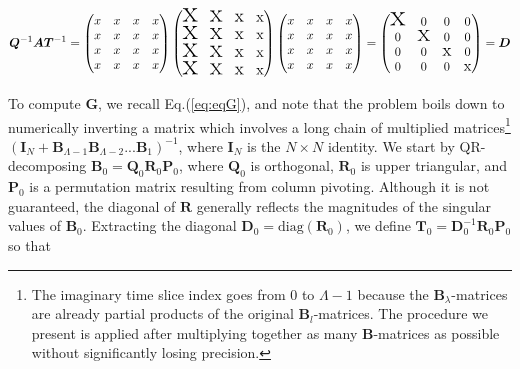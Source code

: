 \begin{equation}
\bm Q^{-1} \bm A \bm T^{-1} =
\begin{pmatrix}
x & x & x & x \\
x & x & x & x \\
x & x & x & x \\ 
x & x & x & x 
\end{pmatrix}
\begin{pmatrix}
$$ \mbox{\Huge x} $$ & $$ \mbox{\huge x} $$ & $$ \mbox{\Large x} $$ & $$ \mbox{\large x} $$\\
$$ \mbox{\Huge x} $$ & $$ \mbox{\huge x} $$ & $$ \mbox{\Large x} $$ & $$ \mbox{\large x} $$ \\
$$ \mbox{\Huge x} $$ & $$ \mbox{\huge x} $$ & $$ \mbox{\Large x} $$ & $$ \mbox{\large x} $$ \\ 
$$ \mbox{\Huge x} $$ & $$ \mbox{\huge x} $$ & $$ \mbox{\Large x} $$ & $$ \mbox{\large x} $$
\end{pmatrix}
\begin{pmatrix}
x & x & x & x \\
x & x & x & x \\
x & x & x & x \\ 
x & x & x & x 
\end{pmatrix} = 
\begin{pmatrix}
$$ \mbox{\Huge x} $$ & 0 & 0 & 0 \\
0 & $$ \mbox{\huge x} $$ & 0 & 0 \\
0 & 0 & $$ \mbox{\Large x} $$ & 0 \\ 
0 & 0 & 0 & $$ \mbox{\large x} $$
\end{pmatrix} = \bm D
\end{equation}

To compute $\bm G$, we recall Eq.(\ref{eq:eqG}), and note that the problem boils down to numerically inverting a matrix which involves a long chain of multiplied matrices\footnote{The imaginary time slice index goes from 0 to $\Lambda - 1$ because the $\bm B_\lambda$-matrices are already partial products of the original $\bm B_l$-matrices.
The procedure we present is applied after multiplying together as many $\bm B$-matrices as possible without significantly losing precision.} $(\bm I_N + \bm B_{\Lambda-1} \bm B_{\Lambda-2} ... \bm B_1)^{-1}$, where $\bm I_N$ is the $N \times N$ identity.
We start by QR-decomposing $\bm B_0 = \bm Q_0 \bm R_0 \bm P_0$, where $\bm Q_0$ is orthogonal, $\bm R_0$ is upper triangular, and $\bm P_0$ is a permutation matrix resulting from column pivoting.
Although it is not guaranteed, the diagonal of $\bm R$ generally reflects the magnitudes of the singular values of $\bm B_0$.
Extracting the diagonal $\bm D_0 = \text{diag} ( \bm R_0 )$, we define $\bm T_0 = \bm D_0^{-1} \bm R_0 \bm P_0$ so that

